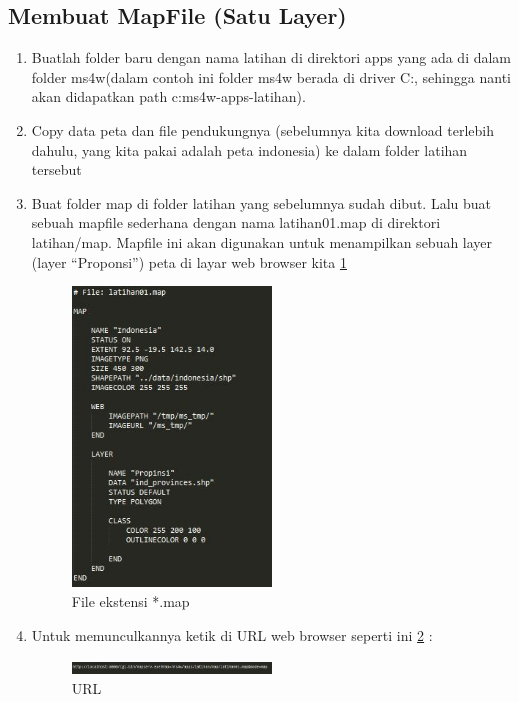 \subsection {Membuat MapFile (Satu Layer)}
\begin {enumerate}
\item Buatlah folder baru dengan nama latihan di direktori apps yang ada di dalam folder
ms4w(dalam contoh ini folder ms4w berada di driver C:, sehingga nanti akan didapatkan path c:ms4w-apps-latihan). 

\item Copy data peta dan file pendukungnya (sebelumnya kita download terlebih dahulu, yang kita pakai adalah peta indonesia) ke dalam folder latihan tersebut

\item Buat folder map di folder latihan yang sebelumnya sudah dibut. Lalu buat sebuah mapfile sederhana dengan nama latihan01.map di direktori latihan/map. Mapfile ini akan digunakan untuk menampilkan sebuah layer (layer “Proponsi”) peta di layar web browser kita \ref{gambar9}
\begin{figure}[ht]
	    \centerline{\includegraphics[width=0.50\textwidth]{figures/gambar9.JPG}}
	    \caption{File ekstensi *.map}
		\label{gambar9}
		\end{figure}

\item Untuk memunculkannya ketik di URL web browser seperti ini \ref{gambar10} :
\begin{figure}[ht]
	    \centerline{\includegraphics[width=0.50\textwidth]{figures/gambar10.JPG}}
	    \caption{URL}
		\label{gambar10}
		\end{figure}


\end{enumerate}
